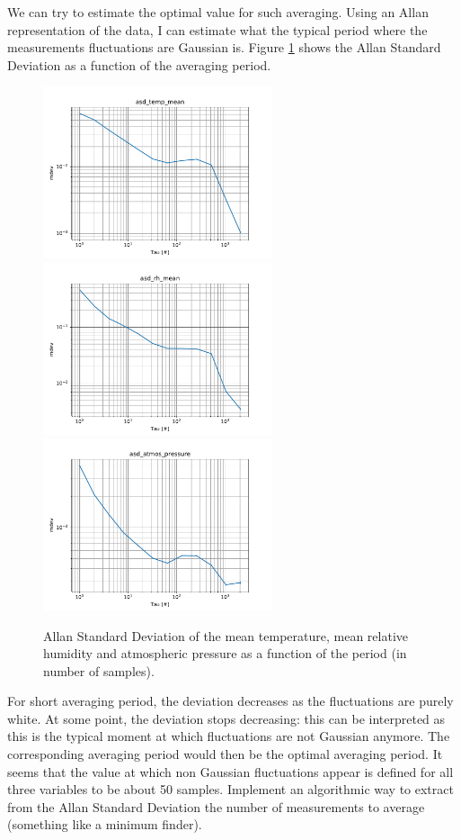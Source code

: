 \documentclass[11pt]{amsart}
\begin{document}
We can try to estimate the optimal value for such averaging.
Using an Allan representation of the data, I can estimate what the typical period where the measurements fluctuations are Gaussian is.
Figure \ref{fig:asd} shows the Allan Standard Deviation as a function of the averaging period.
\begin{figure}
\includegraphics[width=0.6\textwidth]{../plots/asd_temp_mean.pdf}
\includegraphics[width=0.6\textwidth]{../plots/asd_rh_mean.pdf}
\includegraphics[width=0.6\textwidth]{../plots/asd_atmos_pressure.pdf}
\caption{\label{fig:asd}Allan Standard Deviation of the mean temperature, mean relative humidity and atmospheric pressure as a function of the period (in number of samples).}
\end{figure}
For short averaging period, the deviation decreases as the fluctuations are purely white.
At some point, the deviation stops decreasing: this can be interpreted as this is the typical moment at which fluctuations are not Gaussian anymore.
The corresponding averaging period would then be the optimal averaging period.
It seems that the value at which non Gaussian fluctuations appear is defined for all three variables to be about 50 samples.
{\tgf Implement an algorithmic way to extract from the Allan Standard Deviation the number of measurements to average (something like a minimum finder).}
\end{document}
